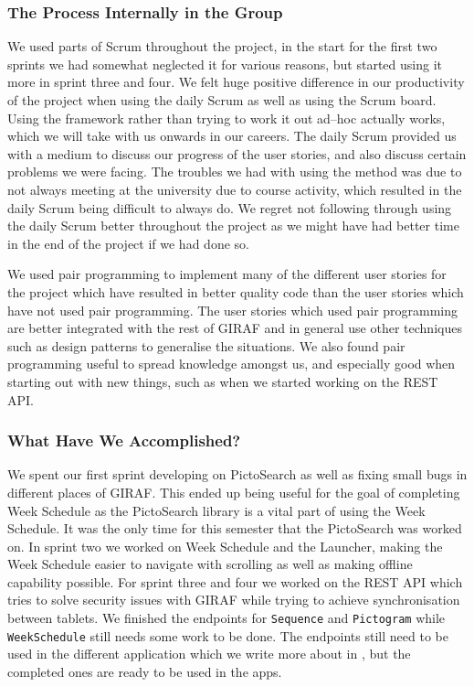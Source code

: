 \subsubsection*{The Process Internally in the Group}
We used parts of Scrum throughout the project, in the start for the first two sprints we had somewhat neglected it for various reasons, but started using it more in sprint three and four. 
We felt huge positive difference in our productivity of the project when using the daily Scrum as well as using the Scrum board.
Using the framework rather than trying to work it out ad--hoc actually works, which we will take with us onwards in our careers.
The daily Scrum provided us with a medium to discuss our progress of the user stories, and also discuss certain problems we were facing.
The troubles we had with using the method was due to not always meeting at the university due to course activity, which resulted in the daily Scrum being difficult to always do.
We regret not following through using the daily Scrum better throughout the project as we might have had better time in the end of the project if we had done so.

We used pair programming to implement many of the different user stories for the project which have resulted in better quality code than the user stories which have not used pair programming.
The user stories which used pair programming are better integrated with the rest of GIRAF and in general use other techniques such as design patterns to generalise the situations.
We also found pair programming useful to spread knowledge amongst us, and especially good when starting out with new things, such as when we started working on the REST API.

\subsubsection*{What Have We Accomplished?}
We spent our first sprint developing on PictoSearch as well as fixing small bugs in different places of GIRAF.
This ended up being useful for the goal of completing Week Schedule as the PictoSearch library is a vital part of using the Week Schedule.
It was the only time for this semester that the PictoSearch was worked on.
In sprint two we worked on Week Schedule and the Launcher, making the Week Schedule easier to navigate with scrolling as well as making offline capability possible.
For sprint three and four we worked on the REST API which tries to solve security issues with GIRAF while trying to achieve synchronisation between tablets.
We finished the endpoints for \texttt{Sequence} and \texttt{Pictogram} while \texttt{WeekSchedule} still needs some work to be done.
The endpoints still need to be used in the different application which we write more about in , but the completed ones are ready to be used in the apps.

